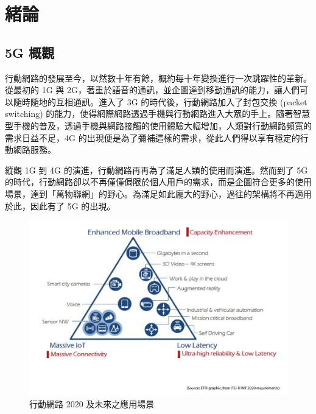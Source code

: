 \chapter{緒論}
\label{chapter:intro}


\section{5G 概觀}
\label{sec:5g_intro}

行動網路的發展至今，以然數十年有餘，概約每十年變換進行一次跳躍性的革新。從最初的 1G 與 2G，著重於語音的通訊，並企圖達到移動通訊的能力，讓人們可以隨時隨地的互相通訊。進入了 3G 的時代後，行動網路加入了封包交換 (packet switching) 的能力，使得網際網路透過手機與行動網路進入大眾的手上。隨著智慧型手機的普及，透過手機與網路接觸的使用體驗大幅增加，人類對行動網路頻寬的需求日益不足，4G 的出現便是為了彌補這樣的需求，從此人們得以享有穩定的行動網路服務。

縱觀 1G 到 4G 的演進，行動網路再再為了滿足人類的使用而演進。然而到了 5G 的時代，行動網路卻以不再僅僅侷限於個人用戶的需求，而是企圖符合更多的使用場景，達到「萬物聯網」的野心。為滿足如此龐大的野心，過往的架構將不再適用於此，因此有了 5G 的出現。

\begin{figure}[htbp]
    \centering
    \includegraphics[height=!,width=0.8\linewidth,keepaspectratio=true]{figures/usage_scenarios_of_IMT_for_2020}
    \caption[行動網路 2020 及未來之應用場景]{{\footnotesize 行動網路 2020 及未來之應用場景~\cite{IMT_2020}}}
    \label{fig:IMT_2020}
\end{figure}

